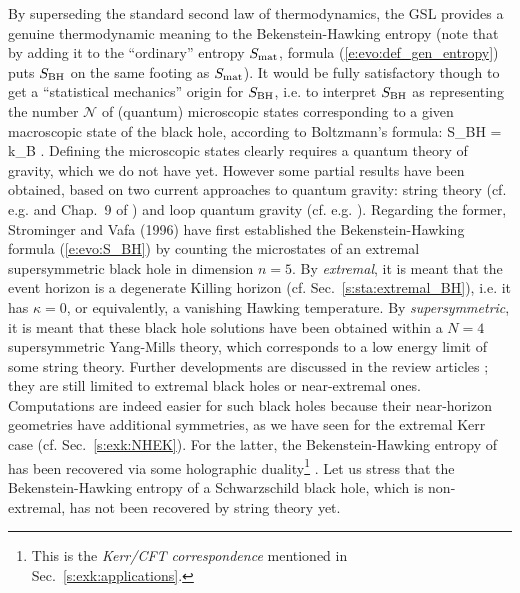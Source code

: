 By superseding the standard second law of thermodynamics, the GSL provides a
genuine thermodynamic meaning to the Bekenstein-Hawking entropy
(note that by adding it to the ``ordinary'' entropy $S_{\rm mat}$, formula (\ref{e:evo:def_gen_entropy})
puts $S_{\rm BH}$ on the same footing as $S_{\rm mat}$). It would be fully satisfactory though to
get a ``statistical mechanics'' origin for $S_{\rm BH}$, i.e. to interpret $S_{\rm BH}$
as representing the number $\mathscr{N}$ of (quantum) microscopic states corresponding to a given macroscopic
state of the black hole, according to Boltzmann's formula:
\be
    S_{\rm BH} = k_{\rm B} \ln {}.
\ee
Defining the microscopic states clearly requires a quantum theory of gravity, which we do not have yet. However some partial results have been
obtained, based on two current approaches to quantum gravity: string theory
(cf. e.g. \cite{Peet01} and Chap.~9 of \cite{GrumiS22})
and loop quantum gravity (cf. e.g. \cite{Perez17,Rovel04}). Regarding the former, Strominger and Vafa (1996) \cite{StromV96} have first established
the Bekenstein-Hawking formula (\ref{e:evo:S_BH}) by counting the microstates
of an extremal supersymmetric black hole in dimension $n=5$. By \emph{extremal}, it is meant
that the event horizon is a degenerate Killing horizon
(cf. Sec.~\ref{s:sta:extremal_BH}), i.e. it has $\kappa=0$, or equivalently,
a vanishing Hawking temperature. By \emph{supersymmetric}, it is meant that these black hole
solutions have been obtained within a $N=4$ supersymmetric Yang-Mills theory,
which corresponds to a low energy limit of some string theory. Further developments are
discussed in the review articles \cite{Carli14,Damou04,Horow98,Wald01,Walla19,Zaffa20}; they are
still limited to extremal black holes or near-extremal ones.
Computations are indeed easier for such black holes because their near-horizon geometries
have additional symmetries, as we have seen for the extremal Kerr case
(cf. Sec.~\ref{s:exk:NHEK}). For the latter, the Bekenstein-Hawking entropy of
has been recovered via some
holographic duality\footnote{This is the \emph{Kerr/CFT correspondence}
mentioned in Sec.~\ref{s:exk:applications}.} \cite{GuicaHSS09,Compe17}.
Let us stress that the Bekenstein-Hawking entropy of a Schwarzschild black hole, which is non-extremal,
has not been recovered by string theory yet.

